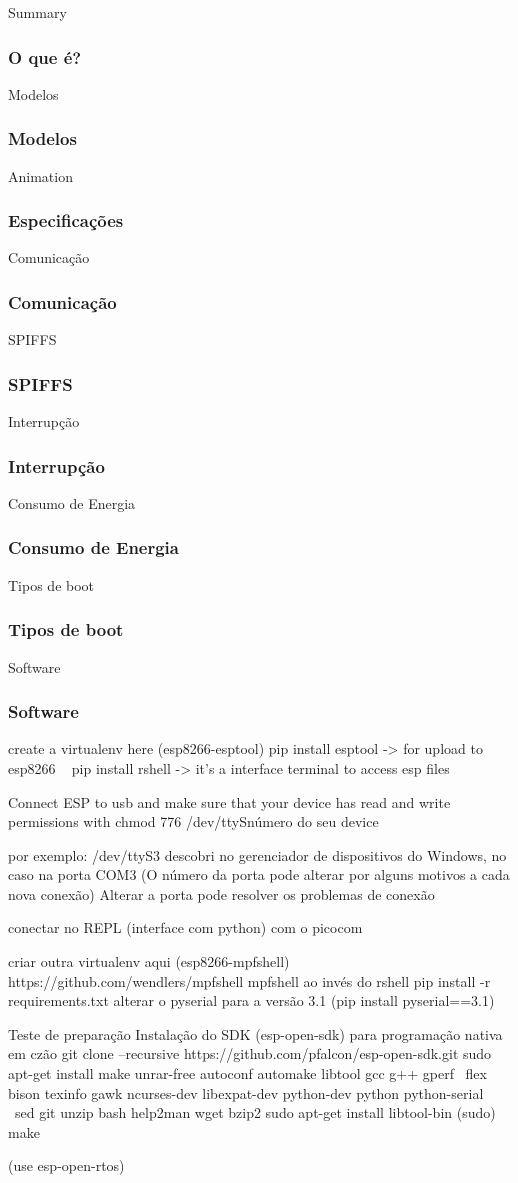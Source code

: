 \documentclass[10pt, compress]{beamer}
\begin{document}
\begin{frame}{Summary}
  \frametitle{O que é?}
\end{frame}

\begin{frame}{Modelos}
  \frametitle{Modelos}
\end{frame}

\begin{frame}{Animation}
  \frametitle{Especificações}
\end{frame}

\begin{frame}{Comunicação}
  \frametitle{Comunicação}
\end{frame}

\begin{frame}{SPIFFS}
  \frametitle{SPIFFS}
\end{frame}

\begin{frame}{Interrupção}
  \frametitle{Interrupção}
\end{frame}

\begin{frame}{Consumo de Energia}
  \frametitle{Consumo de Energia}
\end{frame}

\begin{frame}{Tipos de boot}
  \frametitle{Tipos de boot}
\end{frame}

\begin{frame}{Software}
  \frametitle{Software}
  create a virtualenv here (esp8266-esptool)
  pip install esptool -> for upload to esp8266 
  ~  pip install rshell -> it's a interface terminal to access esp files ~

  Connect ESP to usb and make sure that your device has read and write permissions with 
  chmod 776 /dev/ttyS{número do seu device}

  por exemplo: /dev/ttyS3
  descobri no gerenciador de dispositivos do Windows, no caso na porta COM3 (O número da porta pode alterar por alguns motivos a cada nova conexão)
  Alterar a porta pode resolver os problemas de conexão 

  conectar no REPL (interface com python) com o picocom

  criar outra virtualenv aqui (esp8266-mpfshell)
  https://github.com/wendlers/mpfshell mpfshell ao invés do rshell
  pip install -r requirements.txt
  alterar o pyserial para a versão 3.1 (pip install pyserial==3.1)

  Teste de preparação Instalação do SDK (esp-open-sdk) para programação nativa em czão
  git clone --recursive https://github.com/pfalcon/esp-open-sdk.git
  sudo apt-get install make unrar-free autoconf automake libtool gcc g++ gperf \
      flex bison texinfo gawk ncurses-dev libexpat-dev python-dev python python-serial \
          sed git unzip bash help2man wget bzip2
  sudo apt-get install libtool-bin
  (sudo) make 

  (use esp-open-rtos)

\end{frame}
\end{document}
